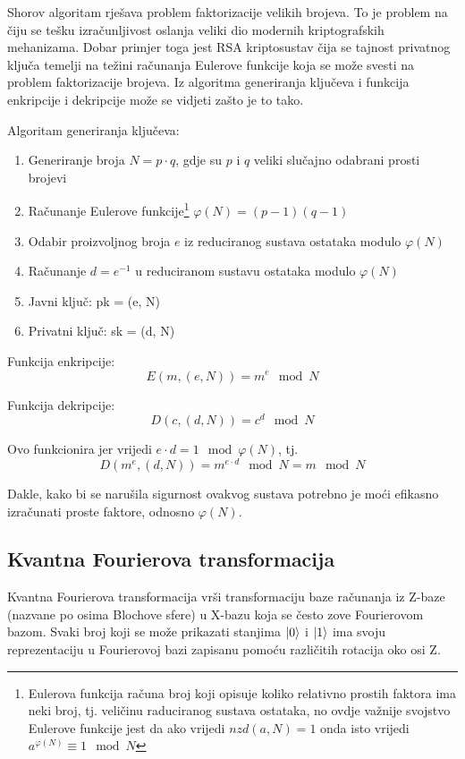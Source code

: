 Shorov algoritam rješava problem faktorizacije velikih brojeva. To je problem na čiju se tešku izračunljivost oslanja veliki dio modernih kriptografskih mehanizama. Dobar primjer toga jest RSA kriptosustav čija se tajnost privatnog ključa temelji na težini računanja Eulerove funkcije koja se može svesti na problem faktorizacije brojeva. Iz algoritma generiranja ključeva i funkcija enkripcije i dekripcije može se vidjeti zašto je to tako.

Algoritam generiranja ključeva:
\begin{enumerate}
\item Generiranje broja $N = p\cdot q$, gdje su $p$ i $q$ veliki slučajno odabrani prosti brojevi
\item Računanje Eulerove funkcije\footnote{Eulerova funkcija računa broj koji opisuje koliko relativno prostih faktora ima neki broj, tj. veličinu raduciranog sustava ostataka, no ovdje važnije svojstvo Eulerove funkcije jest da ako vrijedi $nzd(a, N) = 1$ onda isto vrijedi $a^{\varphi(N)} \equiv 1\mod N$ } $\varphi(N) = (p-1)(q-1)$
\item Odabir proizvoljnog broja $e$ iz reduciranog sustava ostataka modulo $\varphi(N)$
\item Računanje $d = e^{-1}$ u reduciranom sustavu ostataka modulo $\varphi(N)$
\item Javni ključ: pk = (e, N)
\item Privatni ključ: sk = (d, N)
\end{enumerate}

Funkcija enkripcije:
\[
E(m, (e,N)) = m^e \mod N
\]

Funkcija dekripcije:
\[
D(c,(d,N)) = c^d \mod N
\]

Ovo funkcionira jer vrijedi $e\cdot d = 1\mod \varphi(N)$, tj.
\[
D(m^e,(d,N)) = m^{e\cdot d} \mod N = m \mod N
\]

Dakle, kako bi se narušila sigurnost ovakvog sustava potrebno je moći efikasno izračunati proste faktore, odnosno $\varphi(N)$.

\subsection{Kvantna Fourierova transformacija}

Kvantna Fourierova transformacija vrši transformaciju baze računanja iz Z-baze (nazvane po osima Blochove sfere) u X-bazu koja se često zove Fourierovom bazom. Svaki broj koji se može prikazati stanjima $\ket{0}$ i $\ket{1}$ ima svoju reprezentaciju u Fourierovoj bazi zapisanu pomoću različitih rotacija oko osi Z. 

